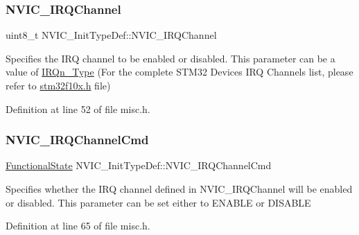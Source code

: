 \subsubsection{\texorpdfstring{N\+V\+I\+C\+\_\+\+I\+R\+Q\+Channel}{NVIC\_IRQChannel}}
{\footnotesize\ttfamily uint8\+\_\+t N\+V\+I\+C\+\_\+\+Init\+Type\+Def\+::\+N\+V\+I\+C\+\_\+\+I\+R\+Q\+Channel}

Specifies the I\+RQ channel to be enabled or disabled. This parameter can be a value of \hyperlink{group___configuration__section__for___c_m_s_i_s_gac3af4a32370fb28c4ade8bf2add80251}{I\+R\+Qn\+\_\+\+Type} (For the complete S\+T\+M32 Devices I\+RQ Channels list, please refer to \hyperlink{stm32f10x_8h}{stm32f10x.\+h} file) 

Definition at line 52 of file misc.\+h.

\mbox{\label{struct_n_v_i_c___init_type_def_acb23fabb995fa4980c768825f12f5815}} 
\subsubsection{\texorpdfstring{N\+V\+I\+C\+\_\+\+I\+R\+Q\+Channel\+Cmd}{NVIC\_IRQChannelCmd}}
{\footnotesize\ttfamily \hyperlink{group___exported__types_gac9a7e9a35d2513ec15c3b537aaa4fba1}{Functional\+State} N\+V\+I\+C\+\_\+\+Init\+Type\+Def\+::\+N\+V\+I\+C\+\_\+\+I\+R\+Q\+Channel\+Cmd}

Specifies whether the I\+RQ channel defined in N\+V\+I\+C\+\_\+\+I\+R\+Q\+Channel will be enabled or disabled. This parameter can be set either to E\+N\+A\+B\+LE or D\+I\+S\+A\+B\+LE 

Definition at line 65 of file misc.\+h.

\mbox{\label{struct_n_v_i_c___init_type_def_aa3fe262c30188404a6e31f922c5ae513}} 
